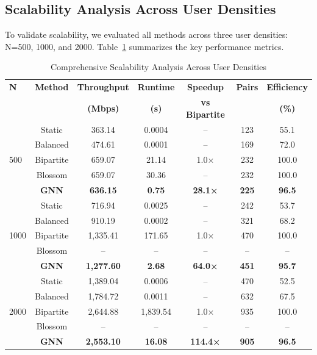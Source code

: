 \subsection{Scalability Analysis Across User Densities}

To validate scalability, we evaluated all methods across three user densities: N=500, 1000, and 2000. Table~\ref{tab:scalability} summarizes the key performance metrics.

\begin{table}[!t]
\centering
\caption{Comprehensive Scalability Analysis Across User Densities}
\label{tab:scalability}
\small
\begin{tabular}{l c c c c c c}
\toprule
\textbf{N} & \textbf{Method} & \textbf{Throughput} & \textbf{Runtime} & \textbf{Speedup} & \textbf{Pairs} & \textbf{Efficiency} \\
 & & \textbf{(Mbps)} & \textbf{(s)} & \textbf{vs Bipartite} & & \textbf{(\%)} \\
\midrule
\multirow{5}{*}{500} & Static & 363.14 & 0.0004 & -- & 123 & 55.1 \\
 & Balanced & 474.61 & 0.0001 & -- & 169 & 72.0 \\
 & Bipartite & 659.07 & 21.14 & 1.0× & 232 & 100.0 \\
 & Blossom & 659.07 & 30.36 & -- & 232 & 100.0 \\
 & \textbf{GNN} & \textbf{636.15} & \textbf{0.75} & \textbf{28.1×} & \textbf{225} & \textbf{96.5} \\
\midrule
\multirow{5}{*}{1000} & Static & 716.94 & 0.0025 & -- & 242 & 53.7 \\
 & Balanced & 910.19 & 0.0002 & -- & 321 & 68.2 \\
 & Bipartite & 1,335.41 & 171.65 & 1.0× & 470 & 100.0 \\
 & Blossom & -- & -- & -- & -- & -- \\
 & \textbf{GNN} & \textbf{1,277.60} & \textbf{2.68} & \textbf{64.0×} & \textbf{451} & \textbf{95.7} \\
\midrule
\multirow{5}{*}{2000} & Static & 1,389.04 & 0.0006 & -- & 470 & 52.5 \\
 & Balanced & 1,784.72 & 0.0011 & -- & 632 & 67.5 \\
 & Bipartite & 2,644.88 & 1,839.54 & 1.0× & 935 & 100.0 \\
 & Blossom & -- & -- & -- & -- & -- \\
 & \textbf{GNN} & \textbf{2,553.10} & \textbf{16.08} & \textbf{114.4×} & \textbf{905} & \textbf{96.5} \\
\bottomrule
\end{tabular}
\end{table}

